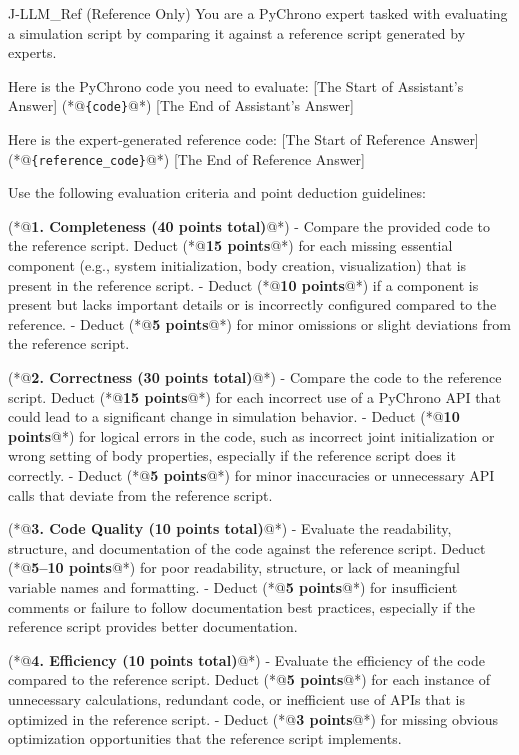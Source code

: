\begin{PromptBlock}{J-LLM\_Ref (Reference Only)}
You are a PyChrono expert tasked with evaluating a simulation script by comparing it against a reference script generated by experts.

Here is the PyChrono code you need to evaluate:
[The Start of Assistant's Answer]
(*@\texttt{\{code\}}@*)
[The End of Assistant's Answer]

Here is the expert-generated reference code:
[The Start of Reference Answer]
(*@\texttt{\{reference\_code\}}@*)
[The End of Reference Answer]

Use the following evaluation criteria and point deduction guidelines:

(*@\textbf{1. Completeness (40 points total)}@*)
- Compare the provided code to the reference script. Deduct (*@\textbf{15 points}@*) for each missing essential component (e.g., system initialization, body creation, visualization) that is present in the reference script.
- Deduct (*@\textbf{10 points}@*) if a component is present but lacks important details or is incorrectly configured compared to the reference.
- Deduct (*@\textbf{5 points}@*) for minor omissions or slight deviations from the reference script.

(*@\textbf{2. Correctness (30 points total)}@*)
- Compare the code to the reference script. Deduct (*@\textbf{15 points}@*) for each incorrect use of a PyChrono API that could lead to a significant change in simulation behavior.
- Deduct (*@\textbf{10 points}@*) for logical errors in the code, such as incorrect joint initialization or wrong setting of body properties, especially if the reference script does it correctly.
- Deduct (*@\textbf{5 points}@*) for minor inaccuracies or unnecessary API calls that deviate from the reference script.

(*@\textbf{3. Code Quality (10 points total)}@*)
- Evaluate the readability, structure, and documentation of the code against the reference script. Deduct (*@\textbf{5--10 points}@*) for poor readability, structure, or lack of meaningful variable names and formatting.
- Deduct (*@\textbf{5 points}@*) for insufficient comments or failure to follow documentation best practices, especially if the reference script provides better documentation.

(*@\textbf{4. Efficiency (10 points total)}@*)
- Evaluate the efficiency of the code compared to the reference script. Deduct (*@\textbf{5 points}@*) for each instance of unnecessary calculations, redundant code, or inefficient use of APIs that is optimized in the reference script.
- Deduct (*@\textbf{3 points}@*) for missing obvious optimization opportunities that the reference script implements.


\end{PromptBlock}
